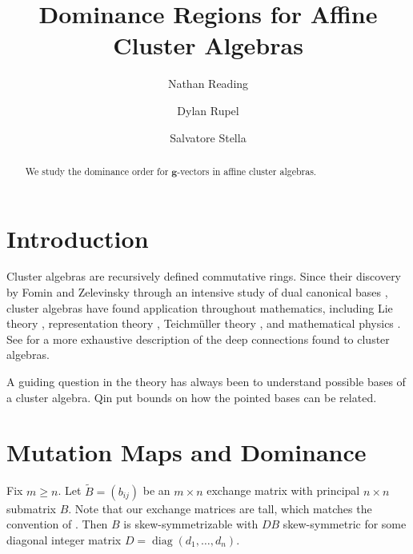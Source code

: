 \documentclass{amsart}
\title{Dominance Regions for Affine Cluster Algebras}
\author{Nathan Reading}
\author{Dylan Rupel}
\author{Salvatore Stella}
\numberwithin{theorem}{section}
\newcommand{\bfg}{\boldsymbol{g}}
\newcommand{\diag}{\operatorname{diag}}
\begin{document}
  \begin{abstract}
    We study the dominance order for $\bfg$-vectors in affine cluster algebras.
  \end{abstract}
  \maketitle

  \section{Introduction}
  Cluster algebras are recursively defined commutative rings.
  Since their discovery by Fomin and Zelevinsky through an intensive study of dual canonical bases \cite{...}, cluster algebras have found application throughout mathematics, including Lie theory \cite{...}, representation theory \cite{...}, Teichm\"uller theory \cite{...}, and mathematical physics \cite{...}.
  See \cite{...} for a more exhaustive description of the deep connections found to cluster algebras.

  A guiding question in the theory has always been to understand possible bases of a cluster algebra.
  Qin put bounds on how the pointed bases can be related.
  


  \section{Mutation Maps and Dominance}
  Fix $m\ge n$.
  Let $\tilde B=(b_{ij})$ be an $m\times n$ exchange matrix with principal $n\times n$ submatrix $B$.
  Note that our exchange matrices are tall, which matches the convention of \cite{qin}.
  Then $B$ is skew-symmetrizable with $DB$ skew-symmetric for some diagonal integer matrix $D=\diag(d_1,\ldots,d_n)$.
 
\end{document}
